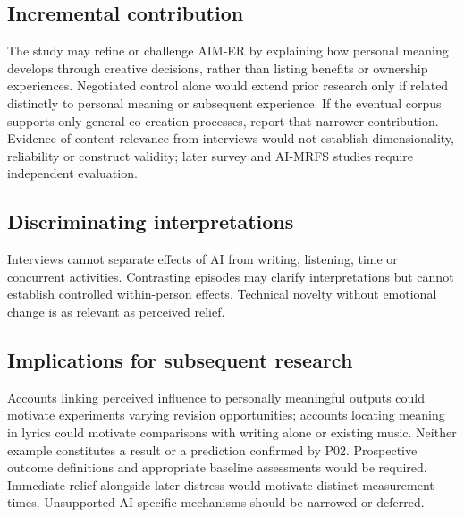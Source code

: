 \documentclass[11pt,a4paper]{article}
\begin{document}
\subsection{Incremental contribution}
The study may refine or challenge AIM-ER by explaining how personal meaning develops through creative decisions, rather than listing benefits or ownership experiences. Negotiated control alone would extend prior research only if related distinctly to personal meaning or subsequent experience. If the eventual corpus supports only general co-creation processes, report that narrower contribution. Evidence of content relevance from interviews would not establish dimensionality, reliability or construct validity; later survey and AI-MRFS studies require independent evaluation.

\subsection{Discriminating interpretations}
Interviews cannot separate effects of AI from writing, listening, time or concurrent activities. Contrasting episodes may clarify interpretations but cannot establish controlled within-person effects. Technical novelty without emotional change is as relevant as perceived relief.

\subsection{Implications for subsequent research}
Accounts linking perceived influence to personally meaningful outputs could motivate experiments varying revision opportunities; accounts locating meaning in lyrics could motivate comparisons with writing alone or existing music. Neither example constitutes a result or a prediction confirmed by P02. Prospective outcome definitions and appropriate baseline assessments would be required. Immediate relief alongside later distress would motivate distinct measurement times. Unsupported AI-specific mechanisms should be narrowed or deferred.
\end{document}
